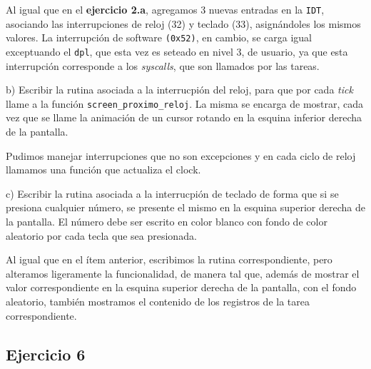 Al igual que en el \textbf{ejercicio 2.a}, agregamos 3 nuevas entradas en la \verb|IDT|, asociando las interrupciones 
de reloj (32) y teclado (33), asign\'andoles los mismos valores. La interrupci\'on de software \verb|(0x52)|, en cambio, 
se carga igual exceptuando el \verb|dpl|, que esta vez es seteado en nivel 3, de usuario, ya que esta interrupción
corresponde a los \textit{syscalls}, que son llamados por las tareas.

\vspace*{0.5cm} \noindent



\noindent
b) Escribir la rutina asociada a la interrucpi\'on del reloj, para que por cada \textit{tick} llame a
la funci\'on \verb|screen_proximo_reloj|. La misma se encarga de mostrar, cada vez que se llame la
animaci\'on de un cursor rotando en la esquina inferior derecha de la pantalla.

\vspace*{0.3cm}

Pudimos manejar interrupciones que no son excepciones y en cada ciclo de reloj
llamamos una función que actualiza el clock.

\vspace*{0.5cm} \noindent



\noindent
c) Escribir la rutina asociada a la interrucpi\'on de teclado de forma que si se presiona cualquier
n\'umero, se presente el mismo en la esquina superior derecha de la pantalla. El n\'umero debe ser
escrito en color blanco con fondo de color aleatorio por cada tecla que sea presionada.

\vspace*{0.3cm}

Al igual que en el ítem anterior, escribimos la rutina correspondiente, pero alteramos ligeramente
la funcionalidad, de manera tal que, además de mostrar el valor correspondiente en la esquina superior 
derecha de la pantalla, con el fondo aleatorio, también mostramos el contenido de los registros de la 
tarea correspondiente.




\newpage





\subsection*{Ejercicio 6}

\vspace*{0.5cm}

